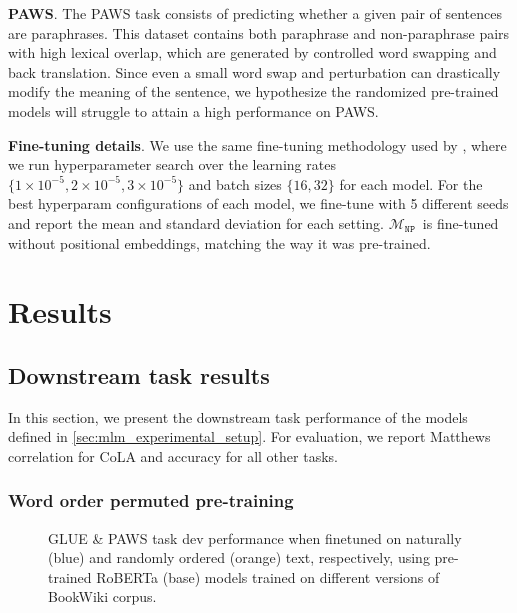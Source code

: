 \documentclass[letterpaper, 12pt]{report}
\newcommand{\xhdr}[1]{{\noindent\bfseries #1}.}
\newcommand{\NP}{$\mathcal{M}_{\texttt{NP}}$}
\begin{document}
\xhdr{PAWS} The PAWS task \cite{zhang-etal-2019-paws} consists of predicting whether a given pair of sentences are paraphrases. This dataset contains both paraphrase and non-paraphrase pairs with high lexical overlap, which are generated by controlled word swapping and back translation. Since even a small word swap and perturbation can drastically modify the meaning of the sentence, we hypothesize the randomized pre-trained models will struggle to attain a high performance on PAWS.

\xhdr{Fine-tuning details} We use the same fine-tuning methodology used by \citet{liu2019b}, where we run hyperparameter search over the learning rates $\{1 \times 10^{-5}, 2 \times 10^{-5}, 3 \times 10^{-5}\}$ and batch sizes $\{16, 32\}$ for each model.
For the best hyperparam configurations of each model, we fine-tune with 5 different seeds and report the mean and standard deviation for each setting. %
\NP\ is fine-tuned without positional embeddings, matching the way it was pre-trained.

\section{Results}
\label{sec:mlm_results}

\subsection{Downstream task results}
\label{sec:mlm_downstream_results}


In this section, we present the downstream task performance of the models defined in \autoref{sec:mlm_experimental_setup}. For evaluation, we report Matthews correlation for CoLA and accuracy for all other tasks.

\subsubsection{Word order permuted pre-training}
\label{sec:mlm_glue_results}



\begin{figure}[ht]
    \centering
    \caption{GLUE \& PAWS task dev performance when finetuned on naturally (blue) and randomly ordered (orange) text, respectively, using pre-trained RoBERTa (base) models trained on different versions of BookWiki corpus.}
    \label{fig:mlm_word_order_glue}
\end{figure}
\end{document}
